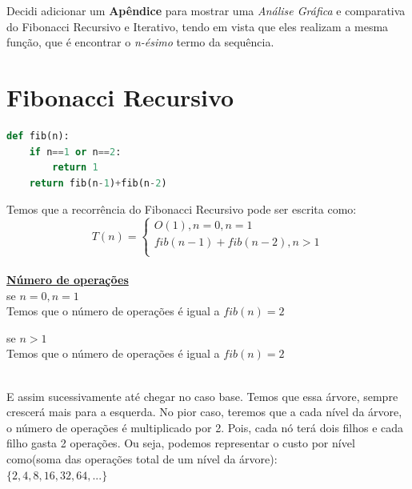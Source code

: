 \documentclass[a4paper, 12pt]{article}
\begin{document}
Decidi adicionar um {\bf Apêndice} para mostrar uma {\it Análise Gráfica} e comparativa do Fibonacci Recursivo e Iterativo, tendo em vista que eles realizam a mesma função, que é encontrar o {\it n-ésimo} termo da sequência.

\newpage

\section{Fibonacci Recursivo}

\begin{lstlisting}[language=Python, caption= Código da função do Fibonacci Recursivo]
def fib(n):
	if n==1 or n==2:
		return 1
	return fib(n-1)+fib(n-2)
\end{lstlisting}

Temos que a recorrência do Fibonacci Recursivo pode ser escrita como:
\begin{equation}
T(n) = \left\{ \begin{array}{l}
O(1), n=0, n=1 \\
fib(n-1)+fib(n-2), n>1\\
\end{array}
\right.
\end{equation} \\

\large\underline{\bf Número de operações} \\

se $n = 0, n = 1$\\
Temos que o número de operações é igual a $fib(n) = 2$

se $n>1$\\
Temos que o número de operações é igual a $fib(n) = 2$ \\

 \\

E assim sucessivamente até chegar no caso base. Temos que essa árvore, sempre crescerá mais para a esquerda. No pior caso, teremos que a cada nível da árvore, o número de operações é multiplicado por 2. Pois, cada nó terá dois filhos e cada filho gasta 2 operações. Ou seja, podemos representar o custo por nível como(soma das operações total de um nível da árvore): \\
$\{2,4,8,16,32,64,...\}$ \\
\end{document}
